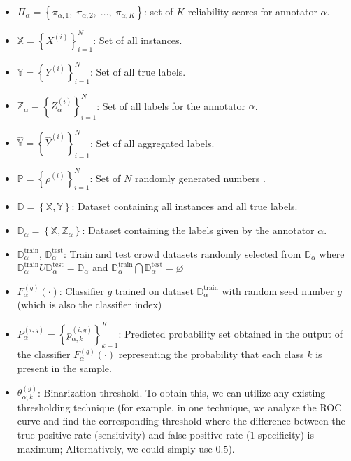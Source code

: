 \documentclass[pdflatex,bst/sn-basic]{bst/sn-jnl}%
\begin{document}
\begin{itemize}
    \item  ${\Pi}_\alpha=\left\{\pi_{\alpha,1},\;\pi_{\alpha,2},\;\dots,\;\pi_{\alpha,K}\right\} $: set of $K $ reliability scores for annotator $\alpha $.

    \item  $\mathbb{X}=\left\{X^{(i)}\right\}_{i=1}^{N} $: Set of all instances.

    \item  $\mathbb{Y}=\left\{Y^{(i)}\right\}_{i=1}^{N} $: Set of all true labels.

    \item  $\mathbb{Z}_\alpha=\left\{Z_\alpha^{(i)}\right\}_{i=1}^{N} $: Set of all labels for the annotator $\alpha $.

    \item  $\widehat{\mathbb{Y}}= \left\{\widehat{Y}^{(i)}\right\}_{i=1}^{N} $: Set of all aggregated labels.

    \item  $\mathbb{P}=\left\{\rho^{(i)}\right\}_{i=1}^{N} $: Set of $N $ randomly generated numbers .

    \item  $\mathbb{D}=\left\{\mathbb{X},\mathbb{Y}\right\} $: Dataset containing all instances and all true labels.

    \item  $\mathbb{D}_\alpha=\left\{\mathbb{X},\mathbb{Z}_\alpha\right\} $: Dataset containing the labels given by the annotator $\alpha $.

    \item  $\mathbb{D}_\alpha^\text{train}$, $\mathbb{D}_\alpha^{\text{test}} $: Train and test crowd datasets randomly selected from $\mathbb{D}_{\alpha} $ where $\mathbb{D}_\alpha^{\text{train}} U \mathbb{D}_\alpha^{\text{test}} = \mathbb{D}_\alpha $ and $\mathbb{D}_\alpha^{\text{train}} \bigcap \mathbb{D}_{\alpha}^{\text{test}}=\varnothing $

    \item  $F_{\alpha}^{(g)}(\cdot)$: Classifier $g $ trained on dataset $\mathbb{D}_{\alpha}^{\mathrm{train}} $ with random seed number $g $ (which is also the classifier index)

    \item  $P_{\alpha}^{(i,g)} = \left\{ p_{\alpha,k}^{(i,g)} \right\}_{k=1}^{K} $: Predicted probability set obtained in the output of the classifier $F_{\alpha}^{(g)}(\cdot) $ representing the probability that each class $k $ is present in the sample.

    \item  $\theta_{\alpha,k}^{(g)} $: Binarization threshold. To obtain this, we can utilize any existing thresholding technique (for example, in one technique, we analyze the ROC curve and find the corresponding threshold where the difference between the true positive rate (sensitivity) and false positive rate (1-specificity) is maximum; Alternatively, we could simply use $0.5 $).


\end{itemize}
\end{document}
